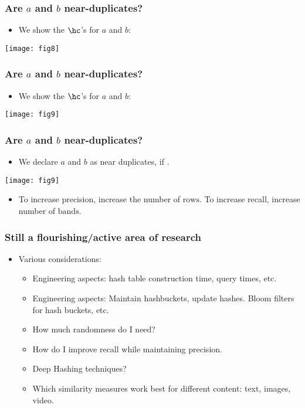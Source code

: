 \documentclass{beamer}
\begin{document}
\begin{frame}
\frametitle{Are $a$ and $b$ near-duplicates?}
\begin{itemize}
\item We show the $\hc$'s for $a$ and $b$:
\end{itemize}
\begin{center}
\texttt{[image: fig8]}
\end{center}
\end{frame}

\begin{frame}
\frametitle{Are $a$ and $b$ near-duplicates?}
\begin{itemize}
\item We show the $\hc$'s for $a$ and $b$:
\end{itemize}
\begin{center}
\texttt{[image: fig9]}
\end{center}
\end{frame}

\begin{frame}
\frametitle{Are $a$ and $b$ near-duplicates?}
\begin{itemize}
\item We declare $a$ and $b$ as near duplicates, if . 
\end{itemize}
\begin{center}
\texttt{[image: fig9]}
\end{center}
\pause
\begin{itemize}
\item To increase precision, increase the number of $\mathrm{rows}$. To increase recall, increase number of $\mathrm{bands}$.
\end{itemize}
\end{frame}

\begin{frame}
\frametitle{Still a flourishing/active area of research}
\begin{itemize}
\item Various considerations:
\begin{itemize}
\item Engineering aspects: hash table construction time, query times, etc. 
\item Engineering aspects: Maintain hashbuckets, update hashes. Bloom filters for hash buckets, etc.
\item How much randomness do I need?
\item How do I improve recall while maintaining precision.
\item Deep Hashing techniques?
\item Which similarity measures work best for different content: text, images, video.
\end{itemize}
\end{itemize}
\end{frame}
\end{document}
